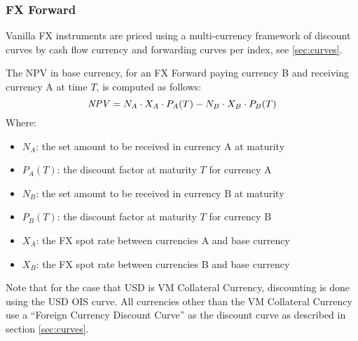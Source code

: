 \subsubsection{FX Forward}
\label{pricing:fx_forward}

Vanilla FX instruments are priced using a multi-currency framework of discount 
curves by cash flow currency and forwarding curves per index, see \ref{sec:curves}.
 
\medskip
The NPV in base currency, for an FX Forward paying currency B and receiving 
currency A at time $T$, is computed as follows:
$$
\mathit{NPV}= N_A \cdot X_A\cdot P_A(T) - N_B\cdot X_B\cdot P_B(T)
$$
Where:
\begin{itemize}
\item $N_A$: the set amount to be received in currency A at maturity
\item $P_A(T)$: the discount factor at maturity $T$ for currency A
\item $N_B$: the set amount to be received in currency B at maturity
\item $P_B(T)$: the discount factor at maturity $T$ for currency B
\item $X_A$: the FX spot rate between currencies A and base currency
\item $X_B$: the FX spot rate between currencies B and base currency
\end{itemize}

Note that for the case that USD is VM Collateral Currency, discounting is 
done using the USD OIS curve. All  currencies other than the VM Collateral Currency use a ``Foreign Currency 
Discount Curve'' as the discount curve as described in section \ref{sec:curves}.

